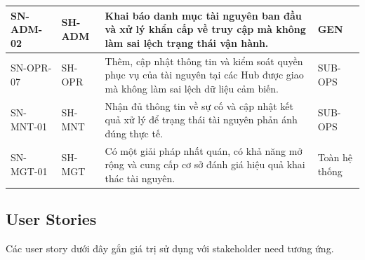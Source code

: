 \begin{longtable}{|L{23mm}|L{27mm}|L{65mm}|L{24mm}|}
  \hline
  SN-ADM-02 & SH-ADM & Khai báo danh mục tài nguyên ban đầu và xử lý khẩn cấp về truy cập mà không làm sai lệch trạng thái vận hành. & GEN\\
  \hline
  SN-OPR-07 & SH-OPR & Thêm, cập nhật thông tin và kiểm soát quyền phục vụ của tài nguyên tại các Hub được giao mà không làm sai lệch dữ liệu cảm biến. & SUB-OPS\\
  \hline
  SN-MNT-01 & SH-MNT & Nhận đủ thông tin về sự cố và cập nhật kết quả xử lý để trạng thái tài nguyên phản ánh đúng thực tế. & SUB-OPS\\
  \hline
  SN-MGT-01 & SH-MGT & Có một giải pháp nhất quán, có khả năng mở rộng và cung cấp cơ sở đánh giá hiệu quả khai thác tài nguyên. & Toàn hệ thống\\
  \hline
\end{longtable}
\endgroup

\subsection{User Stories}

Các user story dưới đây gắn giá trị sử dụng với stakeholder need tương ứng.


